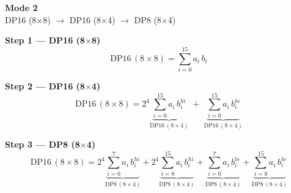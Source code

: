 \documentclass[fleqn]{article}
\newcommand{\DPop}[3]{\mathrm{DP#1}\,(#2\!\times\!#3)}
\begin{document}
\begin{center}
{\LARGE \textbf{Mode 2}}\\[4pt]
{\large DP16 (8$\times$8) $\rightarrow$ DP16 (8$\times$4) $\rightarrow$ DP8 (8$\times$4)}
\end{center}

\vspace{4em}

\noindent\textbf{Step 1 --- DP16 (8$\times$8)}
\[
\DPop{16}{8}{8} = \sum_{i=0}^{15} a_i \, b_i
\]

\vspace{0.5em}

\noindent\textbf{Step 2 --- DP16 (8$\times$4)}
\[
\DPop{16}{8}{8}
  = 2^{4} \underbrace{\sum_{i=0}^{15} a_i \, b_i^{hi}}_{\DPop{16}{8}{4}}
  \; + \; \underbrace{\sum_{i=0}^{15} a_i \, b_i^{lo}}_{\DPop{16}{8}{4}}
\]

\vspace{0.5em}

\noindent\textbf{Step 3 --- DP8 (8$\times$4)}
\[
\DPop{16}{8}{8}
  = 2^{4} \underbrace{\sum_{i=0}^{7} a_i \, b_i^{hi}}_{\DPop{8}{8}{4}}
  + 2^{4} \underbrace{\sum_{i=8}^{15} a_i \, b_i^{hi}}_{\DPop{8}{8}{4}}
  + \underbrace{\sum_{i=0}^{7} a_i \, b_i^{lo}}_{\DPop{8}{8}{4}}
  + \underbrace{\sum_{i=8}^{15} a_i \, b_i^{lo}}_{\DPop{8}{8}{4}}
\]
\end{document}
